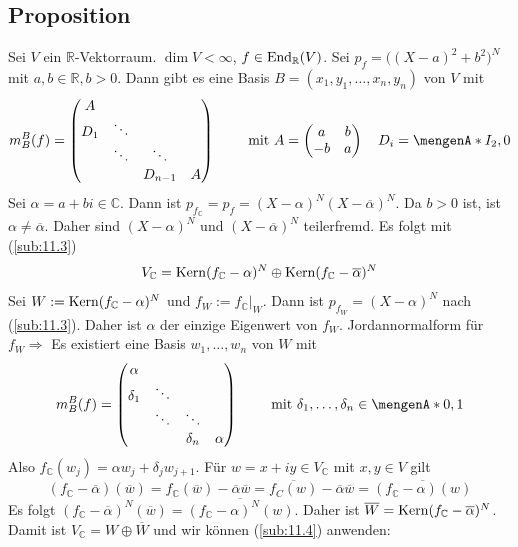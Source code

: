 \subsection[Proposition: Jordansche Normalform mit $2\times 2$-Matrizen auf der Diagonalen]{Proposition} %
\label{sub:117}
Sei $V$ ein $\mathds{R}$-Vektorraum. $\dim V < \infty$, $f \in \operatorname{End}_{\mathbb{R}}(V)$. Sei $p_f = \big((X-a)^2 + b^2\big)^N$ mit $a,b \in \mathds{R}, b>0$. Dann gibt es 
eine Basis $B=(x_1,y_1, \ldots , x_n, y_n)$ von $V$ mit 
\[
	m_B^B(f) = \begin{pmatrix}
		A & & & \\
		D_1 & \ddots & & \\
		& \ddots & \ddots & \\
		& & D_{n-1} &A
	\end{pmatrix} \qquad \text{ mit } A= \begin{pmatrix}
		a &b \\
		-b & a
	\end{pmatrix} \quad D_i = \set{I_2, 0} 
\]
Sei $\alpha = a+ bi \in \mathds{C}$. Dann ist $p_{f_\mathds{C}} = p_f = (X-\alpha)^N (X- \overline{\alpha} )^N$. Da $b>0$ ist, ist $\alpha \not= \overline{\alpha} $. Daher
sind $(X-\alpha)^N$ und $(X- \overline{\alpha} )^N$ teilerfremd. Es folgt mit (\ref{sub:11.3})
\[
	V_{\mathbb{C}} = \operatorname{Kern} (f_{\mathbb{C}}- \alpha)^N \oplus \operatorname{Kern} (f_{\mathbb{C}} - \overline{\alpha} )^N
\]
Sei $W := \operatorname{Kern} (f_{\mathbb{C}} - \alpha)^N$ und $f_W := f_\mathds{C}\big|_W$. Dann ist $p_{f_W} = (X-\alpha)^N$ nach (\ref{sub:11.3}). Daher ist $\alpha$ der einzige
Eigenwert von $f_W$. Jordannormalform für $f_W \Rightarrow $ Es existiert eine Basis $w_1, \ldots , w_n$ von $W$ mit 
\[
	m_B^B (f) = \begin{pmatrix}
		\alpha & & & \\
		\delta_1 & \ddots & & \\
		& \ddots &\ddots & \\
		& & \delta_n & \alpha
	\end{pmatrix} \qquad \text{ mit } \delta_1, \ldots , \delta_n \in \set{0,1} 
\]
Also $f_\mathds{C}(w_j) = \alpha w_j  + \delta_j w_{j+1}$. Für $w=x+iy \in V_\mathds{C}$ mit $x,y \in V$ gilt 
\[
	(f_\mathds{C} - \overline{\alpha} )(\overline{w} ) = f_\mathds{C} (\overline{w} ) - \overline{\alpha} \overline{w} = \overline{f_C(w)} - \overline{\alpha} \overline{w}
	= \overline{(f_\mathds{C} -\alpha)(w)}      
\]
Es folgt $(f_\mathds{C} - \overline{\alpha} )^N (\overline{w} ) = \overline{(f_\mathds{C}- \alpha)^N (w)}$. Daher ist 
$\overline{W} = \operatorname{Kern} (f_{\mathbb{C}}- \overline{\alpha} )^N $. Damit ist $V_\mathds{C} = W \oplus \overline{W} $ und wir können (\ref{sub:11.4}) anwenden:

